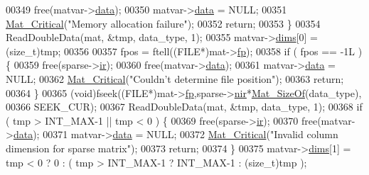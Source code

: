\begin{DoxyCode}
{00349                     free(matvar->\hyperlink{group___m_a_t_a5672978efa230bbdecdf38ede781f7fa}{data});
00350                     matvar->\hyperlink{group___m_a_t_a5672978efa230bbdecdf38ede781f7fa}{data} = NULL;
00351                     \hyperlink{group__mat__util_gaf51f2bfbb5580f575e4dd79757e2b80c}{Mat\_Critical}(\textcolor{stringliteral}{"Memory allocation failure"});
00352                     \textcolor{keywordflow}{return};
00353                 \}
00354                 ReadDoubleData(mat, &tmp, data\_type, 1);
00355                 matvar->\hyperlink{group___m_a_t_a8e01234e1c862ce3472bb37f5a09b92c}{dims}[0] = (size\_t)tmp;
00356 
00357                 fpos = ftell((FILE*)mat->\hyperlink{struct__mat__t_a85f562e407ca9ad4d2a6e14f839432b7}{fp});
00358                 \textcolor{keywordflow}{if} ( fpos == -1L ) \{
00359                     free(sparse->\hyperlink{group___m_a_t_a8d4c863d704edddec5cbfa15b2d719c8}{ir});
00360                     free(matvar->\hyperlink{group___m_a_t_a5672978efa230bbdecdf38ede781f7fa}{data});
00361                     matvar->\hyperlink{group___m_a_t_a5672978efa230bbdecdf38ede781f7fa}{data} = NULL;
00362                     \hyperlink{group__mat__util_gaf51f2bfbb5580f575e4dd79757e2b80c}{Mat\_Critical}(\textcolor{stringliteral}{"Couldn't determine file position"});
00363                     \textcolor{keywordflow}{return};
00364                 \}
00365                 (void)fseek((FILE*)mat->\hyperlink{struct__mat__t_a85f562e407ca9ad4d2a6e14f839432b7}{fp},sparse->\hyperlink{group___m_a_t_aa64636ad57cf87f7a28ff5018437a850}{nir}*\hyperlink{group__mat__util_gab6774aabdc124c540c1e7686d0804940}{Mat\_SizeOf}(data\_type),
00366                     SEEK\_CUR);
00367                 ReadDoubleData(mat, &tmp, data\_type, 1);
00368                 \textcolor{keywordflow}{if} ( tmp > INT\_MAX-1 || tmp < 0 ) \{
00369                     free(sparse->\hyperlink{group___m_a_t_a8d4c863d704edddec5cbfa15b2d719c8}{ir});
00370                     free(matvar->\hyperlink{group___m_a_t_a5672978efa230bbdecdf38ede781f7fa}{data});
00371                     matvar->\hyperlink{group___m_a_t_a5672978efa230bbdecdf38ede781f7fa}{data} = NULL;
00372                     \hyperlink{group__mat__util_gaf51f2bfbb5580f575e4dd79757e2b80c}{Mat\_Critical}(\textcolor{stringliteral}{"Invalid column dimension for sparse matrix"});
00373                     \textcolor{keywordflow}{return};
00374                 \}
00375                 matvar->\hyperlink{group___m_a_t_a8e01234e1c862ce3472bb37f5a09b92c}{dims}[1] = tmp < 0 ? 0 : ( tmp > INT\_MAX-1 ? INT\_MAX-1 : (size\_t)tmp );
}
\end{DoxyCode}
